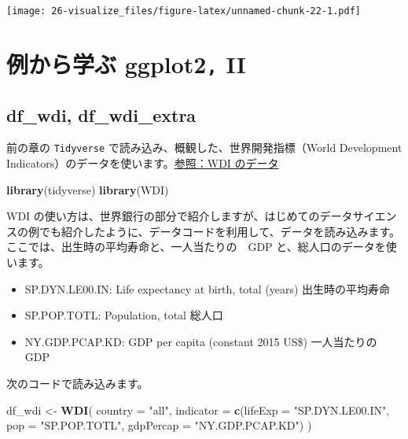 \documentclass[
  xelatex, ja=standard]{bxjsbook}
\newenvironment{Shaded}{\begin{snugshade}}{\end{snugshade}}
\newcommand{\AttributeTok}[1]{\textcolor[rgb]{0.13,0.29,0.53}{#1}}
\newcommand{\FunctionTok}[1]{\textcolor[rgb]{0.13,0.29,0.53}{\textbf{#1}}}
\newcommand{\NormalTok}[1]{#1}
\newcommand{\OtherTok}[1]{\textcolor[rgb]{0.56,0.35,0.01}{#1}}
\newcommand{\StringTok}[1]{\textcolor[rgb]{0.31,0.60,0.02}{#1}}
\providecommand{\tightlist}{%
  \setlength{\itemsep}{0pt}\setlength{\parskip}{0pt}}
\theoremstyle{definition}
\theoremstyle{definition}
\theoremstyle{definition}
\theoremstyle{definition}
\theoremstyle{remark}
\begin{document}
\texttt{[image: 26-visualize\_files/figure-latex/unnamed-chunk-22-1.pdf]}

\hypertarget{ux4f8bux304bux3089ux5b66ux3076-ggplot2-ii}{%
\section{\texorpdfstring{例から学ぶ ggplot2\texttt{,} II}{例から学ぶ ggplot2, II}}\label{ux4f8bux304bux3089ux5b66ux3076-ggplot2-ii}}

\hypertarget{df_wdi-df_wdi_extra-1}{%
\subsection{df\_wdi, df\_wdi\_extra}\label{df_wdi-df_wdi_extra-1}}

前の章の \texttt{Tidyverse} で読み込み、概観した、世界開発指標（World Development Indicators）のデータを使います。\href{https://icu-hsuzuki.github.io/ds4aj/tidyverse.html\#wdi-のデータ}{参照：WDI のデータ}

\begin{Shaded}
\begin{Highlighting}[]
\FunctionTok{library}\NormalTok{(tidyverse)}
\FunctionTok{library}\NormalTok{(WDI)}
\end{Highlighting}
\end{Shaded}

WDI の使い方は、世界銀行の部分で紹介しますが、はじめてのデータサイエンスの例でも紹介したように、データコードを利用して、データを読み込みます。ここでは、出生時の平均寿命と、一人当たりの　GDP と、総人口のデータを使います。

\begin{itemize}
\tightlist
\item
  SP.DYN.LE00.IN: Life expectancy at birth, total (years) 出生時の平均寿命
\item
  SP.POP.TOTL: Population, total 総人口
\item
  NY.GDP.PCAP.KD: GDP per capita (constant 2015 US\$) 一人当たりの　GDP
\end{itemize}

次のコードで読み込みます。

\begin{Shaded}
\begin{Highlighting}[]
\NormalTok{df\_wdi }\OtherTok{\textless{}{-}} \FunctionTok{WDI}\NormalTok{(}
  \AttributeTok{country =} \StringTok{"all"}\NormalTok{, }
  \AttributeTok{indicator =} \FunctionTok{c}\NormalTok{(}\AttributeTok{lifeExp =} \StringTok{"SP.DYN.LE00.IN"}\NormalTok{, }\AttributeTok{pop =} \StringTok{"SP.POP.TOTL"}\NormalTok{, }\AttributeTok{gdpPercap =} \StringTok{"NY.GDP.PCAP.KD"}\NormalTok{)}
\NormalTok{)}
\end{Highlighting}
\end{Shaded}
\end{document}
